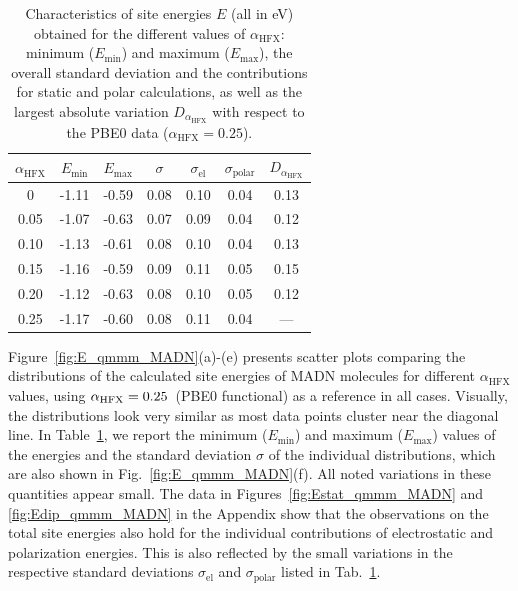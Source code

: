 \documentclass[%
 reprint,
superscriptaddress,
 amsmath,amssymb,
 aps,
prb,
floatfix
]{revtex4-2}
\newcommand{\ahfx}{\ensuremath{\alpha_\text{HFX}}\xspace}
\begin{document}
\begin{table}[tbp]
  \caption{Characteristics of site energies $E$ (all in \unit[]{eV}) obtained for the different values of \ahfx : minimum ($E_\text{min}$) and maximum ($E_\text{max}$), the overall standard deviation and the contributions for static and polar calculations, as well as the largest absolute variation $D_{\ahfx}$ with respect to the PBE0 data ($\ahfx=0.25$).}
  \begin{ruledtabular}
    \begin{tabular}{c c c c c c c}
    $\ahfx$ & $E_\text{min}$ & $E_\text{max}$ & $\sigma$ & $\sigma_\text{el}$ & $\sigma_\text{polar}$ &  $D_{\ahfx}$ \\
    \hline
    0    & -1.11 & -0.59 & 0.08 & 0.10 & 0.04 & 0.13 \\ 
    0.05 & -1.07 & -0.63 & 0.07 & 0.09 & 0.04 & 0.12 \\ 
    0.10 & -1.13 & -0.61 & 0.08 & 0.10 & 0.04 & 0.13 \\ 
    0.15 & -1.16 & -0.59 & 0.09 & 0.11 & 0.05 & 0.15 \\ 
    0.20 & -1.12 & -0.63 & 0.08 & 0.10 & 0.05 & 0.12 \\ 
    0.25 & -1.17 & -0.60 & 0.08 & 0.11 & 0.04 & ---  \\ 
    \end{tabular}
  \end{ruledtabular}
  \label{tab:maxEi}
\end{table}

Figure~\ref{fig:E_qmmm_MADN}(a)-(e) presents scatter plots comparing the distributions of the calculated site energies of MADN molecules for different \ahfx values, using $\ahfx = \unit[0.25]{}$ (PBE0 functional) as a reference in all cases. Visually, the distributions look very similar as most data points cluster near the diagonal line. In Table~\ref{tab:maxEi}, we report the minimum ($E_\text{min}$) and maximum ($E_\text{max}$) values of the energies and the standard deviation $\sigma$ of the individual distributions, which are also shown in Fig.~\ref{fig:E_qmmm_MADN}(f). All noted variations in these quantities appear small. The data in Figures~\ref{fig:Estat_qmmm_MADN} and \ref{fig:Edip_qmmm_MADN} in the Appendix show that the observations on the total site energies also hold for the individual contributions of electrostatic and polarization energies. This is also reflected by the small variations in the respective standard deviations $\sigma_\text{el}$ and $\sigma_\text{polar}$ listed in Tab.~\ref{tab:maxEi}.
\end{document}
